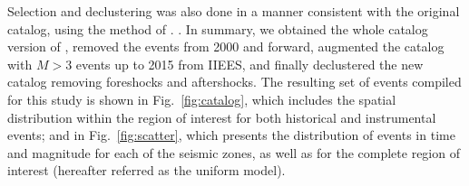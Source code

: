 Selection and declustering was also done in a manner consistent with the original catalog, using the me\-thod of \citet{Gardner1974}. . In summary, we obtained the whole catalog version of \citet{Zare2014}, removed the events from 2000 and forward, augmented the catalog with $M>3$ events up to 2015 from IIEES, and finally declustered the new catalog removing foreshocks and aftershocks. The resulting set of events compiled for this study is shown in Fig.~\ref{fig:catalog}, which includes the spatial distribution within the region of interest for both historical and instrumental events; and in Fig.~\ref{fig:scatter}, which presents the distribution of events in time and magnitude for each of the seismic zones, as well as for the complete region of interest (hereafter referred as the uniform model).
